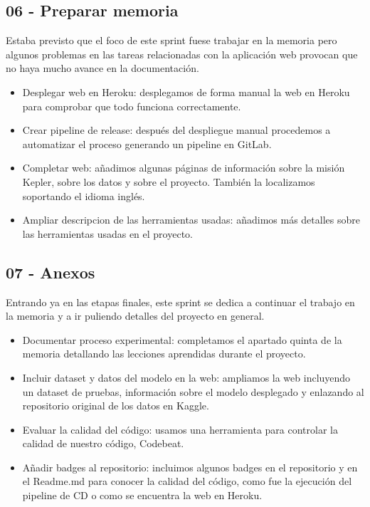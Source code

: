 \subsection{06 - Preparar memoria \newline
[05/05/2020 - 18/05/2020]}

Estaba previsto que el foco de este sprint fuese trabajar en la memoria pero algunos problemas en las tareas relacionadas con la aplicación web provocan que no haya mucho avance en la documentación.

\begin{itemize}
    \item Desplegar web en Heroku: desplegamos de forma manual la web en Heroku para comprobar que todo funciona correctamente.
    \item Crear pipeline de release: después del despliegue manual procedemos a automatizar el proceso generando un pipeline en GitLab.
    \item Completar web: añadimos algunas páginas de información sobre la misión Kepler, sobre los datos y sobre el proyecto. También la localizamos soportando el idioma inglés.
    \item Ampliar descripcion de las herramientas usadas: añadimos más detalles sobre las herramientas usadas en el proyecto.
\end{itemize}


\subsection{07 - Anexos 
\newline[19/05/2020 – 31/05/2020]}

Entrando ya en las etapas finales, este sprint se dedica a continuar el trabajo en la memoria y a ir puliendo detalles del proyecto en general.

\begin{itemize}
    \item Documentar proceso experimental: completamos el apartado quinta de la memoria detallando las lecciones aprendidas durante el proyecto.
    \item Incluir dataset y datos del modelo en la web: ampliamos la web incluyendo un dataset de pruebas, información sobre el modelo desplegado y enlazando al repositorio original de los datos en Kaggle.
    \item Evaluar la calidad del código: usamos una herramienta para controlar la calidad de nuestro código, Codebeat.
    \item Añadir badges al repositorio: incluimos algunos badges en el repositorio y en el Readme.md para conocer la calidad del código, como fue la ejecución del pipeline de CD o como se encuentra la web en Heroku.    
\end{itemize}


